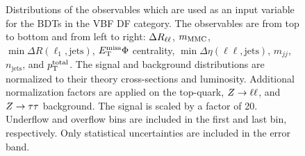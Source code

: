\begin{figure}[htb]
\begin{subfigure}[t]{0.3\textwidth}
    \end{subfigure}
    \caption{Distributions of the observables which are used as an input variable for the BDTs in the VBF DF category.
             The observables are from top to bottom and from left to right: $\Delta R_{\ell\ell}$, $m_\text{MMC}$, $\min \Delta R (\ell_1, \text{jets})$,
             $E_\text{T}^\text{miss} \Phi$ centrality, $\min \Delta \eta (\ell\ell, \text{jets})$, $m_{jj}$, $n_\text{jets}$, and $p_\text{T}^\text{total}$.
             The signal and background distributions are normalized to their theory cross-sections and luminosity.
             Additional normalization factors are applied on the top-quark, $Z \to \ell \ell$, and $Z \to \tau \tau$ background.
             The signal is scaled by a factor of 20.
             Underflow and overflow bins are included in the first and last bin, respectively.
             Only statistical uncertainties are included in the error band.}\label{fig:mva:modeling:sr:vbfdf}
\end{figure}

